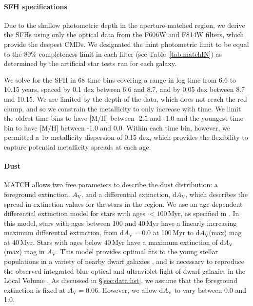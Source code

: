 \documentclass[preprint2]{aastex62}
\newcommand{\Myr}{$\,$Myr\xspace}
\newcommand{\Av}{\ensuremath{A_{\mathrm{V}}}\xspace}
\newcommand{\dAv}{\ensuremath{\mathrm{d}A_{\mathrm{V}}}\xspace}
\begin{document}
\paragraph{SFH specifications}
Due to the shallow photometric depth in the aperture-matched region, we derive the SFHs using only the optical data from the F606W and F814W filters, which provide the deepest CMDs. We designated the faint photometric limit to be equal to the 80\% completeness limit in each filter (see Table~\ref{tab:matchIN}) as determined by the artificial star tests run for each galaxy. %

We solve for the SFH in 68 time bins covering a range in log time from 6.6 to 10.15 years, spaced by 0.1 dex between 6.6 and 8.7, and by 0.05 dex between 8.7 and 10.15. We are limited by the depth of the data, which does not reach the red clump, and so we constrain the metallicity to only increase with time. We limit the oldest time bins to have [M/H] between -2.5 and -1.0 and the youngest time bin to have [M/H] between -1.0 and 0.0. Within each time bin, however, we permitted a $1\sigma$ metallicity dispersion of 0.15 dex, which provides the flexibility to capture potential metallicity spreads at each age.

\paragraph{Dust}
MATCH allows two free parameters to describe the dust distribution: a foreground extinction, \Av, and a differential extinction, \dAv, which describes the spread in extinction values for the stars in the region. We use an age-dependent differential extinction model for stars with ages $<100$\Myr, as specified in \citet{Dolphin+2003}. In this model, stars with ages between 100 and 40\Myr have a linearly increasing maximum differential extinction, from \dAv$= 0.0$ at 100\Myr to \dAv(max) mag at 40\Myr. Stars with ages below $40$\Myr have a maximum extinction of \dAv(max) mag in \Av. This model provides optimal fits to the young stellar populations in a variety of nearby dwarf galaxies \citep[e.g.,][]{Dolphin+2003, Skillman+2003, Weisz+2011}, and is necessary to reproduce the observed integrated blue-optical and ultraviolet light of dwarf galaxies in the Local Volume \citep{Johnson+2013}. As discussed in \S\ref{sec:data:hst}, we assume that the foreground extinction is fixed at \Av$=0.06$. However, we allow \dAv to vary between 0.0 and 1.0.
\end{document}

